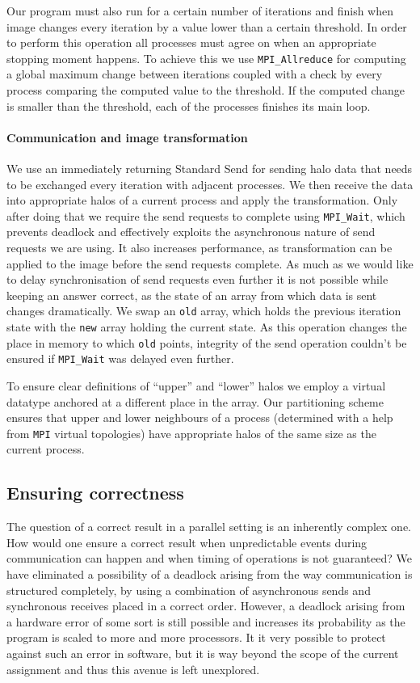 \documentclass[11pt,a4paper]{article}
\begin{document}
Our program must also run for a certain number of iterations and finish when image changes every iteration by a value lower than a certain threshold.
In order to perform this operation all processes must agree on when an appropriate stopping moment happens.
To achieve this we use \texttt{MPI\_Allreduce} for computing a global maximum change between iterations coupled with a check by every process comparing the computed value to the threshold.
If the computed change is smaller than the threshold, each of the processes finishes its main loop.

\paragraph{Communication and image transformation}
We use an immediately returning Standard Send for sending halo data that needs to be exchanged every iteration with adjacent processes.
We then receive the data into appropriate halos of a current process and apply the transformation. 
Only after doing that we require the send requests to complete using \texttt{MPI\_Wait}, which prevents deadlock and effectively exploits the asynchronous nature of send requests we are using.
It also increases performance, as transformation can be applied to the image before the send requests complete.
As much as we would like to delay synchronisation of send requests even further it is not possible while keeping an answer correct, as the state of an array from which data is sent changes dramatically.
We swap an \texttt{old} array, which holds the previous iteration state with the \texttt{new} array holding the current state.
As this operation changes the place in memory to which \texttt{old} points, integrity of the send operation couldn't be ensured if \texttt{MPI\_Wait} was delayed even further.

To ensure clear definitions of ``upper'' and ``lower'' halos we employ a virtual datatype anchored at a different place in the array.
Our partitioning scheme ensures that upper and lower neighbours of a process (determined with a help from \texttt{MPI} virtual topologies) have appropriate halos of the same size as the current process.

\subsection{Ensuring correctness}
\label{sec:correctness}
The question of a correct result in a parallel setting is an inherently complex one. 
How would one ensure a correct result when unpredictable events during communication can happen and when timing of operations is not guaranteed?
We have eliminated a possibility of a deadlock arising from the way communication is structured completely, by using a combination of asynchronous sends and synchronous receives placed in a correct order.
However, a deadlock arising from a hardware error of some sort is still possible and increases its probability as the program is scaled to more and more processors.
It it very possible to protect against such an error in software, but it is way beyond the scope of the current assignment and thus this avenue is left unexplored.
\end{document}
